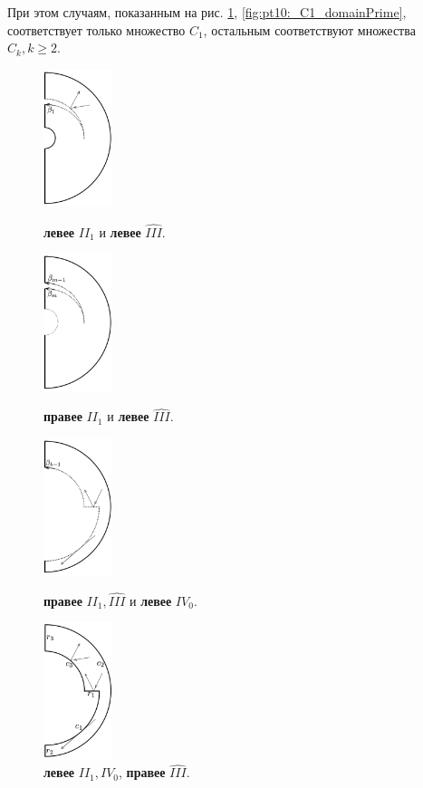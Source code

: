 \begin{statement}
При этом случаям, показанным на рис. \ref{fig:pt10:_C1_domain}, \ref{fig:pt10:_C1_domainPrime}, соответствует только множество $C_1$, остальным соответствуют множества $C_k, k\geq 2$.
\label{stat:domain_shapes}
\begin{figure}[!htb]
\centering
\includegraphics[width=2cm]{images/ch4/section3_circular/atoms/branching/terminal_min.pdf}
    \caption{\textbf{левее} $II_1$ и \textbf{левее} $\widehat{III}$.}
    \label{fig:pt10:_terminal_min_domain}
\endminipage\hfill
{}
\centering
\includegraphics[width=2cm]{images/ch4/section3_circular/atoms/branching/branching_domain.pdf}
    \caption{\textbf{правее} $II_1$ и \textbf{левее} $\widehat{III}$.}
    \label{fig:pt10:_branching_domain}
\endminipage\hfill
{}
\centering
\includegraphics[width=2cm]{images/ch4/section3_circular/atoms/branching/terminal_max.pdf}
    \caption{\textbf{правее} $II_1, \widehat{III}$ и \textbf{левее} $IV_0$.}
    \label{fig:pt10:_terminal_max_domain}
\endminipage\hfill
{}
\centering
\includegraphics[width=2cm]{images/ch4/section3_circular/atoms/branching/sect3_C1_domain.pdf}
    \caption{\textbf{левее} $II_1, IV_0$, \textbf{правее} $\widehat{III}$.}
    \label{fig:pt10:_C1_domain}
\endminipage\hfill
\end{figure}


\end{statement}
